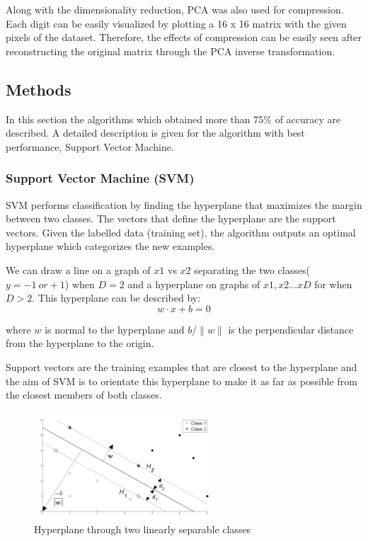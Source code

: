 \documentclass[letterpaper,10pt]{article}
\theoremstyle{mytheor}
\begin{document}
Along with the dimensionality reduction, PCA was also used for compression. Each digit can be easily visualized by plotting a 16 x 16 matrix with the given pixels of the dataset. Therefore, the effects of compression can be easily seen after reconstructing the original matrix through the PCA inverse transformation. 
 
\subsection{Methods}

In this section the algorithms which obtained more than 75\% of accuracy are described. A detailed description is given for the algorithm with best performance, Support Vector Machine.

\subsubsection{Support Vector Machine (SVM)}

SVM performs classification by finding the hyperplane that maximizes the margin between two classes. The vectors that define the hyperplane are the support vectors. Given the labelled data (training set), the algorithm outputs an optimal hyperplane which categorizes the new examples.

We can draw a line on a graph of $x1$ vs $x2$ separating the two classes($y = -1\  or +1$) when $D = 2$ and a hyperplane on graphs of $x1, x2 ...xD$ for when $D > 2$.  This hyperplane can be described by:
\begin{equation}
w \cdot x + b = 0
\end{equation}

where $w$ is normal to the hyperplane and $b/\|w\|$ is the perpendicular distance from the hyperplane to the origin.

Support vectors are the training examples that are closest to the hyperplane and the aim of SVM is to orientate this hyperplane to make it as far as possible from the closest members of both classes.

\begin{figure}[H]
\includegraphics[width=0.6\textwidth]{svm}
\centering
\caption{Hyperplane through two linearly separable classes}
\label{fig:2}
\end{figure}
\end{document}
